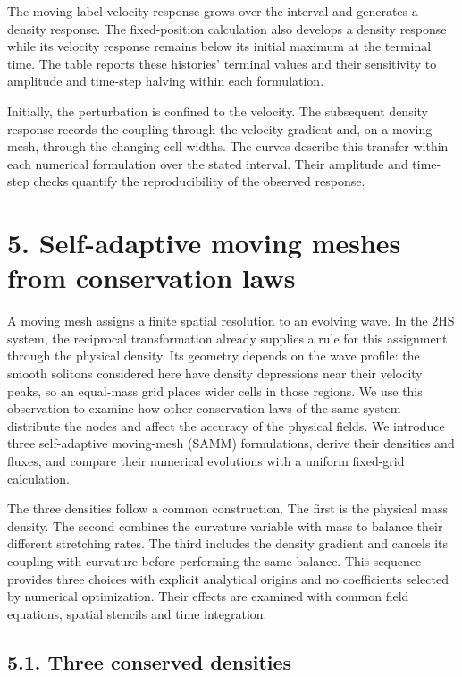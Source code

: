 \documentclass[11pt,a4paper]{article}
\begin{document}
The moving-label velocity response grows over the interval and generates a density response. The fixed-position calculation also develops a density response while its velocity response remains below its initial maximum at the terminal time. The table reports these histories’ terminal values and their sensitivity to amplitude and time-step halving within each formulation.

Initially, the perturbation is confined to the velocity. The subsequent density response records the coupling through the velocity gradient and, on a moving mesh, through the changing cell widths. The curves describe this transfer within each numerical formulation over the stated interval. Their amplitude and time-step checks quantify the reproducibility of the observed response.

\FloatBarrier
\section*{5. Self-adaptive moving meshes from conservation laws}

A moving mesh assigns a finite spatial resolution to an evolving wave. In the 2HS system, the reciprocal transformation already supplies a rule for this assignment through the physical density. Its geometry depends on the wave profile: the smooth solitons considered here have density depressions near their velocity peaks, so an equal-mass grid places wider cells in those regions. We use this observation to examine how other conservation laws of the same system distribute the nodes and affect the accuracy of the physical fields. We introduce three self-adaptive moving-mesh (SAMM) formulations, derive their densities and fluxes, and compare their numerical evolutions with a uniform fixed-grid calculation.

The three densities follow a common construction. The first is the physical mass density. The second combines the curvature variable with mass to balance their different stretching rates. The third includes the density gradient and cancels its coupling with curvature before performing the same balance. This sequence provides three choices with explicit analytical origins and no coefficients selected by numerical optimization. Their effects are examined with common field equations, spatial stencils and time integration.

\subsection*{5.1. Three conserved densities}
\end{document}

